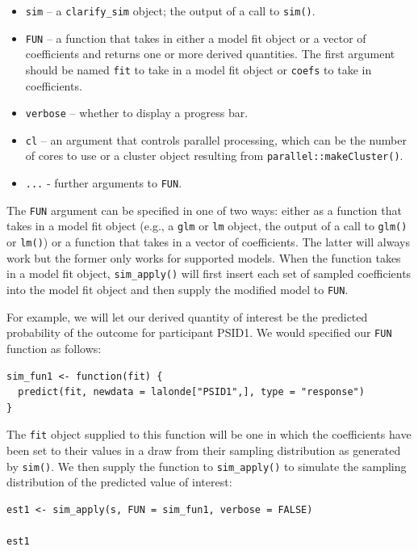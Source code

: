 \begin{itemize}
\item
  \texttt{sim} -- a \texttt{clarify\_sim} object; the output of a call to \texttt{sim()}.
\item
  \texttt{FUN} -- a function that takes in either a model fit object or a vector of coefficients and returns one or more derived quantities. The first argument should be named \texttt{fit} to take in a model fit object or \texttt{coefs} to take in coefficients.
\item
  \texttt{verbose} -- whether to display a progress bar.
\item
  \texttt{cl} -- an argument that controls parallel processing, which can be the number of cores to use or a cluster object resulting from \texttt{parallel::makeCluster()}.
\item
  \texttt{...} - further arguments to \texttt{FUN}.
\end{itemize}

The \texttt{FUN} argument can be specified in one of two ways: either as a function that takes in a model fit object (e.g., a \texttt{glm} or \texttt{lm} object, the output of a call to \texttt{glm()} or \texttt{lm()}) or a function that takes in a vector of coefficients. The latter will always work but the former only works for supported models. When the function takes in a model fit object, \texttt{sim\_apply()} will first insert each set of sampled coefficients into the model fit object and then supply the modified model to \texttt{FUN}.

For example, we will let our derived quantity of interest be the predicted probability of the outcome for participant PSID1. We would specified our \texttt{FUN} function as follows:

\begin{verbatim}
sim_fun1 <- function(fit) {
  predict(fit, newdata = lalonde["PSID1",], type = "response")
}
\end{verbatim}

The \texttt{fit} object supplied to this function will be one in which the coefficients have been set to their values in a draw from their sampling distribution as generated by \texttt{sim()}. We then supply the function to \texttt{sim\_apply()} to simulate the sampling distribution of the predicted value of interest:

\begin{verbatim}
est1 <- sim_apply(s, FUN = sim_fun1, verbose = FALSE)

est1
\end{verbatim}

